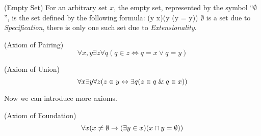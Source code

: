 \begin{definition}{(Empty Set)}\label{def:emptyset}
For an arbitrary set $x$, the empty set, represented by the symbol ``$\emptyset$'', is the set defined by the following formula:
\beq
(\forall y \in x)(y \in \emptyset \iff \neg(y = y))
\eeq
$\emptyset$ is a set due to \emph{Specification}, there is only one such set due to \emph{Extensionality}. %
\end{definition}

\begin{definition}{(Axiom of Pairing)}\label{def:pairing}
\begin{equation}
\forall x, y \exists z \forall q (q \in z \iff q = x \lor q = y) %
\end{equation}
\end{definition}

\begin{definition}{(Axiom of Union)}\label{def:union}
\begin{equation}
\forall x \exists y \forall z (z \in y \iff \exists q( z \in q \et q \in x)) %
\end{equation}
\end{definition}

%

Now we can introduce more axioms.
\begin{definition}{(Axiom of Foundation)}\label{def:foundation}
\begin{equation}
\forall x (x \neq \emptyset \then (\exists y \in x) (x \cap y = \emptyset)) %
\end{equation}
\end{definition}

